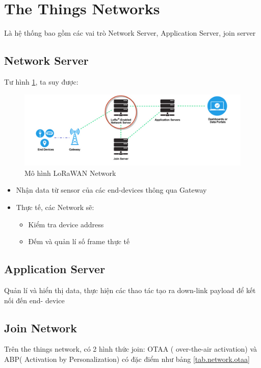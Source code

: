 \section{The Things Networks}
Là hệ thống bao gồm các vai trò Network Server, Application Server, join server

\subsection{Network Server}
Tư hình \ref{fig:lorawan_network}, ta suy được:
\begin{figure}[h]
    \includegraphics[width=\textwidth]{images/Quanh/LoraWan_Netwrok.png}
    \caption{Mô hình LoRaWAN Network}
    \label{fig:lorawan_network}
\end{figure}

\begin{itemize}
    \item Nhận data từ sensor của các end-devices thông qua Gateway
    \item Thực tế, các Network sẽ:
    \begin{itemize}
        \item Kiểm tra device address
        \item Đếm và quản lí số frame thực tế
    \end{itemize}
\end{itemize}

\subsection{Application Server}
Quản lí và hiển thị data, thực hiện các thao tác tạo ra down-link payload để kết nối đến end- device

\subsection{Join Network}
Trên the things network, có 2 hình thức join: OTAA ( over-the-air activation) và ABP( Activation by Personalization) có đặc điểm như bảng \ref{tab.network.otaa}

